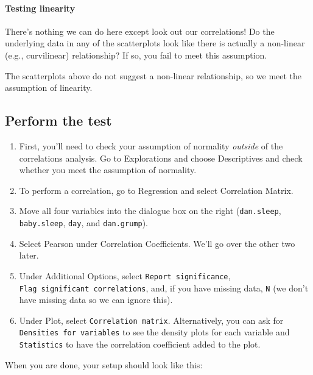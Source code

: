 \documentclass[
]{book}
\begin{document}
\hypertarget{testing-linearity}{%
\paragraph{Testing linearity}\label{testing-linearity}}

There's nothing we can do here except look out our correlations! Do the underlying data in any of the scatterplots look like there is actually a non-linear (e.g., curvilinear) relationship? If so, you fail to meet this assumption.

The scatterplots above do not suggest a non-linear relationship, so we meet the assumption of linearity.

\hypertarget{perform-the-test-9}{%
\subsection{Perform the test}\label{perform-the-test-9}}

\begin{enumerate}
\def\labelenumi{\arabic{enumi}.}
\item
  First, you'll need to check your assumption of normality \emph{outside} of the correlations analysis. Go to Explorations and choose Descriptives and check whether you meet the assumption of normality.
\item
  To perform a correlation, go to Regression and select Correlation Matrix.
\item
  Move all four variables into the dialogue box on the right (\texttt{dan.sleep}, \texttt{baby.sleep}, \texttt{day}, and \texttt{dan.grump}).
\item
  Select Pearson under Correlation Coefficients. We'll go over the other two later.
\item
  Under Additional Options, select \texttt{Report\ significance}, \texttt{Flag\ significant\ correlations}, and, if you have missing data, \texttt{N} (we don't have missing data so we can ignore this).
\item
  Under Plot, select \texttt{Correlation\ matrix}. Alternatively, you can ask for \texttt{Densities\ for\ variables} to see the density plots for each variable and \texttt{Statistics} to have the correlation coefficient added to the plot.
\end{enumerate}

When you are done, your setup should look like this:
\end{document}

